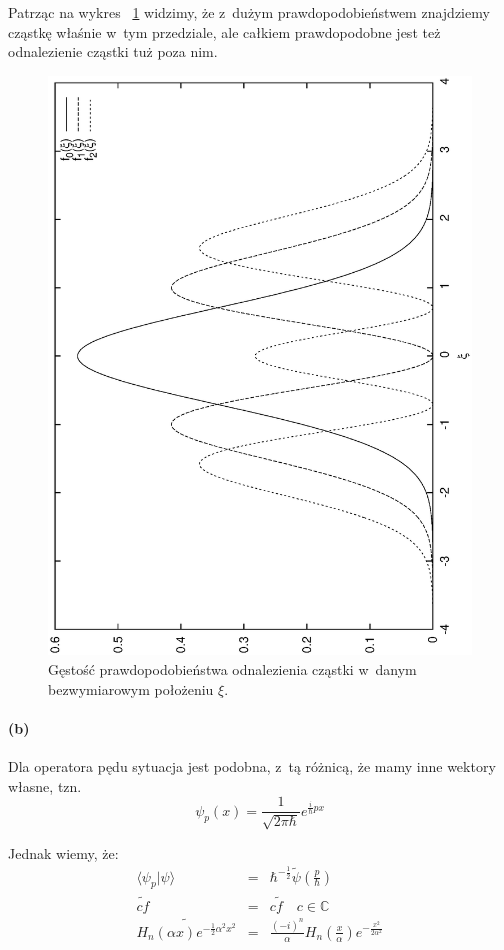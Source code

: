 \documentclass{article}
\begin{document}
Patrząc na wykres ~\ref{fig:polozenie} widzimy, że z~dużym prawdopodobieństwem
znajdziemy cząstkę właśnie w~tym przedziale, ale całkiem prawdopodobne
jest też odnalezienie cząstki tuż poza nim.

\begin{figure}[h!]
\includegraphics{l5z2p1.eps}
\caption{Gęstość prawdopodobieństwa odnalezienia cząstki w~danym bezwymiarowym położeniu $\xi$.}
\label{fig:polozenie}
\end{figure}

\paragraph{(b)}

Dla operatora pędu sytuacja jest podobna, z~tą różnicą, że mamy inne wektory własne, tzn.
\[
\psi_p(x) = \frac{1}{\sqrt{2\pi\hbar}}e^{\frac{i}{\hbar}px}
\]

Jednak wiemy, że:
\begin{eqnarray}
\langle\psi_p|\psi\rangle &=& 
	\hbar^{-\frac{1}{2}}\widetilde{\psi}\left(\frac{p}{\hbar}\right) \label{be1} \\
\widetilde{cf} &=& c\widetilde{f} \quad c \in \mathbb{C} \label{be2} \\
\widetilde{H_n(\alpha{}x)e^{-\frac{1}{2}\alpha^2{}x^2}} &=& 
	\frac{(-i)^n}{\alpha}H_n\left(\frac{x}{\alpha}\right)e^{-\frac{x^2}{2\alpha^2}} \label{be3}
\end{eqnarray}
\end{document}
